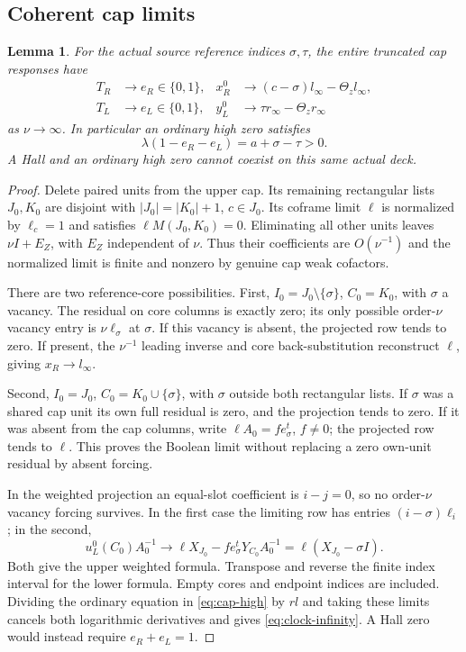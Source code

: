 \documentclass[11pt,a4paper]{amsart}
\numberwithin{equation}{section}
\theoremstyle{plain}
\newtheorem{lemma}[theorem]{Lemma}
\theoremstyle{definition}
\begin{document}
\subsection{Coherent cap limits}
\begin{lemma}\label{lem:boolean}
For the actual source reference indices \(\sigma,\tau\), the entire truncated cap responses have
\[
\begin{aligned}
 T_R&\longrightarrow e_R\in\{0,1\},&
 x_R^0&\longrightarrow(c-\sigma)l_\infty-\Theta_z l_\infty,\\
 T_L&\longrightarrow e_L\in\{0,1\},&
 y_L^0&\longrightarrow\tau r_\infty-\Theta_z r_\infty
\end{aligned}
\]
as \(\nu\to\infty\).  In particular an ordinary high zero satisfies
\begin{equation}\label{eq:clock-infinity}
 \lambda(1-e_R-e_L)=a+\sigma-\tau>0.
\end{equation}
A Hall and an ordinary high zero cannot coexist on this same actual deck.
\end{lemma}
\begin{proof}
Delete paired units from the upper cap.  Its remaining rectangular lists \(J_0,K_0\) are disjoint with \(|J_0|=|K_0|+1\), \(c\in J_0\).  Its coframe limit \(\ell\) is normalized by \(\ell_c=1\) and satisfies \(\ell M(J_0,K_0)=0\).  Eliminating all other units leaves \(\nu I+E_Z\), with \(E_Z\) independent of \(\nu\).  Thus their coefficients are \(O(\nu^{-1})\) and the normalized limit is finite and nonzero by genuine cap weak cofactors.

There are two reference-core possibilities.  First, \(I_0=J_0\setminus\{\sigma\}\), \(C_0=K_0\), with \(\sigma\) a vacancy.  The residual on core columns is exactly zero; its only possible order-\(\nu\) vacancy entry is \(\nu\ell_\sigma\) at \(\sigma\).  If this vacancy is absent, the projected row tends to zero.  If present, the \(\nu^{-1}\) leading inverse and core back-substitution reconstruct \(\ell\), giving \(x_R\to l_\infty\).

Second, \(I_0=J_0\), \(C_0=K_0\cup\{\sigma\}\), with \(\sigma\) outside both rectangular lists.  If \(\sigma\) was a shared cap unit its own full residual is zero, and the projection tends to zero.  If it was absent from the cap columns, write \(\ell A_0=f e_\sigma^t\), \(f\ne0\); the projected row tends to \(\ell\).  This proves the Boolean limit without replacing a zero own-unit residual by absent forcing.

In the weighted projection an equal-slot coefficient is \(i-j=0\), so no order-\(\nu\) vacancy forcing survives.  In the first case the limiting row has entries \((i-\sigma)\ell_i\); in the second,
\[
 u_L^0(C_0)A_0^{-1}\longrightarrow
 \ell X_{J_0}-f e_\sigma^tY_{C_0}A_0^{-1}
 =\ell(X_{J_0}-\sigma I).
\]
Both give the upper weighted formula.  Transpose and reverse the finite index interval for the lower formula.  Empty cores and endpoint indices are included.  Dividing the ordinary equation in \eqref{eq:cap-high} by \(rl\) and taking these limits cancels both logarithmic derivatives and gives \eqref{eq:clock-infinity}.  A Hall zero would instead require \(e_R+e_L=1\).
\end{proof}
\end{document}
